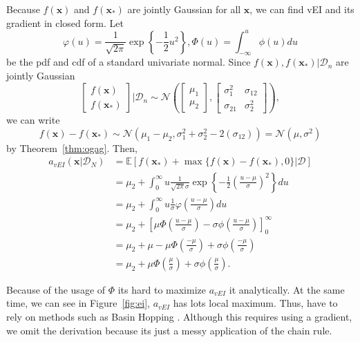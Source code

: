 Because $f(\mathbf{x})$ and $f(\mathbf{x}_*)$ are jointly Gaussian for all $\mathbf{x}$, we can find vEI and its gradient in closed form.
Let
\begin{equation*}
    \varphi(u) = \frac{ 1 }{ \sqrt{ 2 \pi } } \exp \left\{ -\frac12 u^2 \right\},
    \Phi(u) = \int_{-\infty}^{u} \phi(u) du
\end{equation*}
be the pdf and cdf of a standard univariate normal.
Since $f(\mathbf{x}), f(\mathbf{x}_*) | \mathcal{D}_n$ are jointly Gaussian
\begin{equation*}
    \begin{bmatrix}
        f(\mathbf{x}) \\
        f(\mathbf{x}_*)
    \end{bmatrix}
    | \mathcal{D}_n
    \sim \mathcal{N}\left(
    \begin{bmatrix}
            \mu_1 \\
            \mu_2
        \end{bmatrix}
    ,
    \begin{bmatrix}
            \sigma_{1}^2 & \sigma_{12} \\
            \sigma_{21} & \sigma^2_2
        \end{bmatrix}
    \right),
\end{equation*}
we can write
\begin{equation*}
    f(\mathbf{x}) - f(\mathbf{x}_*) \sim \mathcal{N}(\mu_1 - \mu_2, \sigma_1^2 + \sigma_2^2 - 2(\sigma_{12}))
    = \mathcal{N}(\mu, \sigma^2)
\end{equation*}
by Theorem~\ref{thm:ogag}.
Then,
\begin{align*}
    a_{vEI}(\mathbf{x} | \mathcal{D}_N)
    & =  \mathbb{E}[f(\mathbf{x}_*) + \max \{  f(\mathbf{x}) - f(\mathbf{x}_*), 0 \} | \mathcal{D}] \\
    & = \mu_2 + \int_{0}^\infty u \frac{ 1 }{ \sqrt{2 \pi } \sigma} \exp \left\{ -\frac12 \left(\frac{ u - \mu }{ \sigma }\right)^2 \right\} du \\
    & = \mu_2 + \int_{0}^\infty u \frac{ 1 }{ \sigma } \varphi\left(\frac{ u - \mu }{ \sigma }\right) du \\
    & = \mu_2 + \left[ \mu \Phi\left(\frac{ u - \mu }{ \sigma }\right) - \sigma \phi\left(\frac{ u - \mu }{ \sigma }\right)\right]_{0}^{\infty} \\
    & = \mu_2 +  \mu - \mu \Phi\left(\frac{ -\mu }{ \sigma }\right) + \sigma \phi\left(\frac{ -\mu }{ \sigma }\right) \\
    & = \mu_2 + \mu \Phi\left(\frac{ \mu }{ \sigma }\right) + \sigma \phi\left(\frac{ \mu }{ \sigma }\right).
\end{align*}

Because of the usage of $\Phi$ its hard to maximize $a_{vEI}$ it analytically.
At the same time, we can see in Figure~\ref{fig:ei}, $a_{vEI}$ has lots local maximum.
Thus, have to rely on methods such as Basin Hopping \cite{wales1997}.
Although this requires using a gradient, we omit the derivation because its just a messy application of the chain rule.


